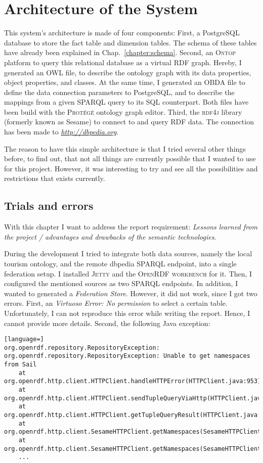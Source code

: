 
\section{Architecture of the System}
\label{chapter:architecture}

This system's architecture is made of four components: First, a PostgreSQL database to store the fact table and dimension tables. The schema of these tables have already been explained in Chap.~\ref{chapter:schema}. Second, an \textsc{Ontop} platform to query this relational database as a virtual RDF graph. Hereby, I generated an OWL file, to describe the ontology graph with its data properties, object properties, and classes. At the same time, I generated an OBDA file to define the data connection parameters to PostgreSQL, and to describe the mappings from a given SPARQL query to its SQL counterpart. Both files have been build with the \textsc{Prot\'eg\'e} ontology graph editor. Third, the \textsc{rdf4j} library (formerly known as Sesame) to connect to and query RDF data. The connection has been made to \textit{\url{http://dbpedia.org}}. 

The reason to have this simple architecture is that I tried several other things before, to find out, that not all things are currently possible that I wanted to use for this project. However, it was interesting to try and see all the possibilities and restrictions that exists currently. 

\subsection{Trials and errors}
With this chapter I want to address the report requirement: \textit{Lessons learned from the project / advantages and drawbacks of the
semantic technologies}.

During the development I tried to integrate both data sources, namely the local tourism ontology, and the remote dbpedia SPARQL endpoint, into a single federation setup. I installed \textsc{Jetty} and the \textsc{OpenRDF workbench} for it. Then, I configured the mentioned sources as two SPARQL endpoints. In addition, I wanted to generated a \textit{Federation Store}. However, it did not work, since I got two errors. First, an \textit{Virtuoso Error: No permission} to select a certain table. Unfortunately, I can not reproduce this error while writing the report. Hence, I cannot provide more details. Second, the following Java exception:
\begin{lstlisting}[language=]
org.openrdf.repository.RepositoryException: org.openrdf.repository.RepositoryException: Unable to get namespaces from Sail
	at org.openrdf.http.client.HTTPClient.handleHTTPError(HTTPClient.java:953)
	at org.openrdf.http.client.HTTPClient.sendTupleQueryViaHttp(HTTPClient.java:718)
	at org.openrdf.http.client.HTTPClient.getTupleQueryResult(HTTPClient.java:643)
	at org.openrdf.http.client.SesameHTTPClient.getNamespaces(SesameHTTPClient.java:321)
	at org.openrdf.http.client.SesameHTTPClient.getNamespaces(SesameHTTPClient.java:302)
	...
\end{lstlisting}


